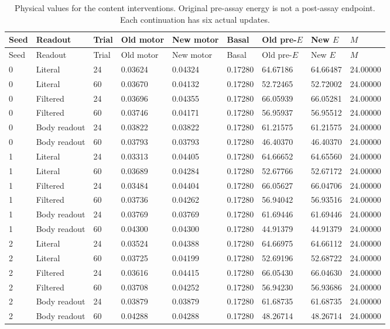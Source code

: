 \begin{longtable}{lllllllll}
\caption{Physical values for the content interventions. Original pre-assay energy is not a post-assay endpoint. Each continuation has six actual updates.}\label{tab:history-content-costs}\\
\toprule
Seed & Readout & Trial & Old motor & New motor & Basal & Old pre-$E$ & New $E$ & $M$ \\
\midrule
\endfirsthead
\toprule
Seed & Readout & Trial & Old motor & New motor & Basal & Old pre-$E$ & New $E$ & $M$ \\
\midrule
\endhead
0 & Literal & 24 & 0.03624 & 0.04324 & 0.17280 & 64.67186 & 64.66487 & 24.00000 \\
0 & Literal & 60 & 0.03670 & 0.04132 & 0.17280 & 52.72465 & 52.72002 & 24.00000 \\
0 & Filtered & 24 & 0.03696 & 0.04355 & 0.17280 & 66.05939 & 66.05281 & 24.00000 \\
0 & Filtered & 60 & 0.03746 & 0.04171 & 0.17280 & 56.95937 & 56.95512 & 24.00000 \\
0 & Body readout & 24 & 0.03822 & 0.03822 & 0.17280 & 61.21575 & 61.21575 & 24.00000 \\
0 & Body readout & 60 & 0.03793 & 0.03793 & 0.17280 & 46.40370 & 46.40370 & 24.00000 \\
1 & Literal & 24 & 0.03313 & 0.04405 & 0.17280 & 64.66652 & 64.65560 & 24.00000 \\
1 & Literal & 60 & 0.03689 & 0.04284 & 0.17280 & 52.67766 & 52.67172 & 24.00000 \\
1 & Filtered & 24 & 0.03484 & 0.04404 & 0.17280 & 66.05627 & 66.04706 & 24.00000 \\
1 & Filtered & 60 & 0.03736 & 0.04262 & 0.17280 & 56.94042 & 56.93516 & 24.00000 \\
1 & Body readout & 24 & 0.03769 & 0.03769 & 0.17280 & 61.69446 & 61.69446 & 24.00000 \\
1 & Body readout & 60 & 0.04300 & 0.04300 & 0.17280 & 44.91379 & 44.91379 & 24.00000 \\
2 & Literal & 24 & 0.03524 & 0.04388 & 0.17280 & 64.66975 & 64.66112 & 24.00000 \\
2 & Literal & 60 & 0.03725 & 0.04199 & 0.17280 & 52.69196 & 52.68722 & 24.00000 \\
2 & Filtered & 24 & 0.03616 & 0.04415 & 0.17280 & 66.05430 & 66.04630 & 24.00000 \\
2 & Filtered & 60 & 0.03708 & 0.04252 & 0.17280 & 56.94230 & 56.93686 & 24.00000 \\
2 & Body readout & 24 & 0.03879 & 0.03879 & 0.17280 & 61.68735 & 61.68735 & 24.00000 \\
2 & Body readout & 60 & 0.04288 & 0.04288 & 0.17280 & 48.26714 & 48.26714 & 24.00000 \\
\bottomrule
\end{longtable}
\endgroup
